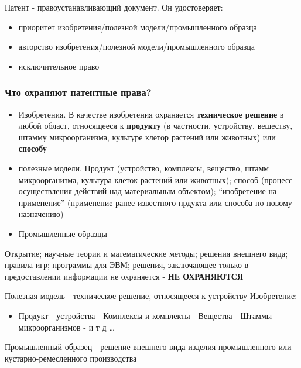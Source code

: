 \documentclass[12pt]{article}
\begin{document}
Патент - правоустанавливающий документ. Он удостоверяет:
\begin{itemize} 
\item приоритет изобретения/полезной модели/промышленного образца 
\item авторство изобретения/полезной модели/промышленного образца
\item исключительное право
\end{itemize}

\hypertarget{ux447ux442ux43e-ux43eux445ux440ux430ux43dux44fux44eux442-ux43fux430ux442ux435ux43dux442ux43dux44bux435-ux43fux440ux430ux432ux430}{%
\subsubsection{Что охраняют патентные
права?}\label{ux447ux442ux43e-ux43eux445ux440ux430ux43dux44fux44eux442-ux43fux430ux442ux435ux43dux442ux43dux44bux435-ux43fux440ux430ux432ux430}}

\begin{itemize}
\item
  Изобретения. В качестве изобретения охраняется \textbf{техническое
  решение} в любой област, относящееся к \textbf{продукту} (в частности,
  устройству, веществу, штамму микроорганизма, культуре клетор растений
  или животных) или \textbf{способу}
\item
  полезные модели. Продукт (устройство, комплексы, вещество, штамм
  микроорганизма, культура клеток растений или животных); способ
  (процесс осуществления действий над материальным объектом);
  ``изобретение на применение'' (применение ранее известного прдукта или
  способа по новому назначению)
\item
  Промышленные образцы
\end{itemize}

Открытие; научные теории и математические методы; решения внешнего вида;
правила игр; программы для ЭВМ; решения, заключающее только в
предоставлении информации не охраняется - \textbf{НЕ ОХРАНЯЮТСЯ}

Полезная модель - техническое решение, относящееся к устройству
Изобретение:
\begin{itemize}
\item Продукт - устройства - Комплексы и комплекты - Вещества -
Штаммы микроорганизмов - и т д \ldots{}
\end{itemize}

Промышленный образец - решение внешнего вида изделия промышленного или
кустарно-ремесленного производства
\end{document}
